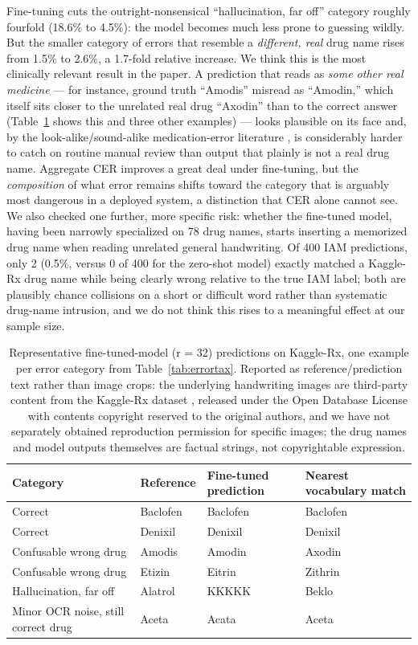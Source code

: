 \documentclass[12pt]{article}
\begin{document}
Fine-tuning cuts the outright-nonsensical ``hallucination, far off'' category roughly fourfold (18.6\% to
4.5\%): the model becomes much less prone to guessing wildly. But the smaller category of errors that
resemble a \textit{different, real} drug name rises from 1.5\% to 2.6\%, a 1.7-fold relative increase. We
think this is the most clinically relevant result in the paper. A prediction that reads as \textit{some
other real medicine} --- for instance, ground truth ``Amodis'' misread as ``Amodin,'' which itself sits
closer to the unrelated real drug ``Axodin'' than to the correct answer (Table~\ref{tab:qualitative} shows
this and three other examples) --- looks plausible on its face and,
by the look-alike/sound-alike medication-error
literature \citep{Bryan2021LASA,Ostini2012LASA,Karet2023TallMan}, is considerably harder to catch on routine
manual review than output that plainly is not a real drug name. Aggregate CER improves a great deal under
fine-tuning, but the \textit{composition} of what error remains shifts toward the category that is arguably
most dangerous in a deployed system, a distinction that CER alone cannot see. We also checked one further,
more specific risk: whether the fine-tuned model, having been narrowly specialized on 78 drug names, starts
inserting a memorized drug name when reading unrelated general handwriting. Of 400 IAM predictions, only
2 (0.5\%, versus 0 of 400 for the zero-shot model) exactly matched a Kaggle-Rx drug name while being clearly
wrong relative to the true IAM label; both are plausibly chance collisions on a short or difficult word
rather than systematic drug-name intrusion, and we do not think this rises to a meaningful effect at our
sample size.

\begin{table}[ht]
\centering
\caption{Representative fine-tuned-model (r = 32) predictions on Kaggle-Rx, one example per error category
from Table~\ref{tab:errortax}. Reported as reference/prediction text rather than image crops: the underlying
handwriting images are third-party content from the Kaggle-Rx dataset \citep{Mia2024KaggleRx}, released
under the Open Database License with contents copyright reserved to the original authors, and we have not
separately obtained reproduction permission for specific images; the drug names and model outputs
themselves are factual strings, not copyrightable expression.}
\label{tab:qualitative}
\begin{tabular}{llll}
\toprule
Category & Reference & Fine-tuned prediction & Nearest vocabulary match \\
\midrule
Correct & Baclofen & Baclofen & Baclofen \\
Correct & Denixil & Denixil & Denixil \\
Confusable wrong drug & Amodis & Amodin & Axodin \\
Confusable wrong drug & Etizin & Eitrin & Zithrin \\
Hallucination, far off & Alatrol & KKKKK & Beklo \\
Minor OCR noise, still correct drug & Aceta & Acata & Aceta \\
\bottomrule
\end{tabular}
\end{table}
\end{document}
